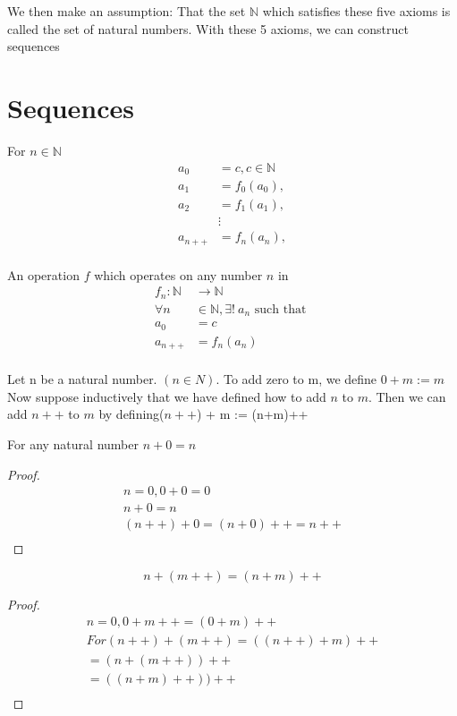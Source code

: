 \documentclass[11pt]{report}
\begin{document}
We then make an assumption: That the set \(\mathbb{N}\) which satisfies these five axioms is called the set of natural numbers.
With these 5 axioms, we can construct sequences
\section{Sequences}
\label{sec:org8e47123}
For \(n \in \mathbb{N}\)
\begin{align*}
a_0 &= c, c \in \mathbb{N} \\
a_1 &= f_0(a_0), \\
a_2 &= f_1(a_1), \\
&\vdots \\
a_{n++} &= f_n(a_n), \\
\end{align*}

\begin{prop}
An operation $f$ which operates on any number $n$ in 
\begin{align*}
f_n: \mathbb{N} &\rightarrow \mathbb{N} \\
\forall n &\in \mathbb{N}, \exists! \ a_n \text{ such that } \\
a_0 &= c \\
a_{n++} &= f_n(a_n) \\
\end{align*}
\end{prop}

\begin{definition}
Let n be a natural number. $(n \in N)$. To add zero to m, we define $0+m:=m$ Now suppose inductively that we have defined how to add $n$ to $m$. Then we can add $n++$ to $m$ by defining($n++$) + m := (n+m)++
\end{definition}

\begin{lemma}
For any natural number $n + 0=n$
\end{lemma}
\begin{proof}
\begin{align*}
n = 0, 0 + 0 = 0 \\
n+0 = n \\
(n++) + 0 = (n+0)++ = n++ \\
\end{align*}
\end{proof}
\begin{lemma}
\[
n + (m++) = (n+m)++
\]
\end{lemma}
\begin{proof}
\begin{align*}
n = 0, 0 + m++ = (0+m)++ \\
For
(n++) + (m++) = ((n++)+m)++ \\
=(n+(m++))++ \\
=((n+m)++))++ \\
\end{align*}
\end{proof}
\end{document}
